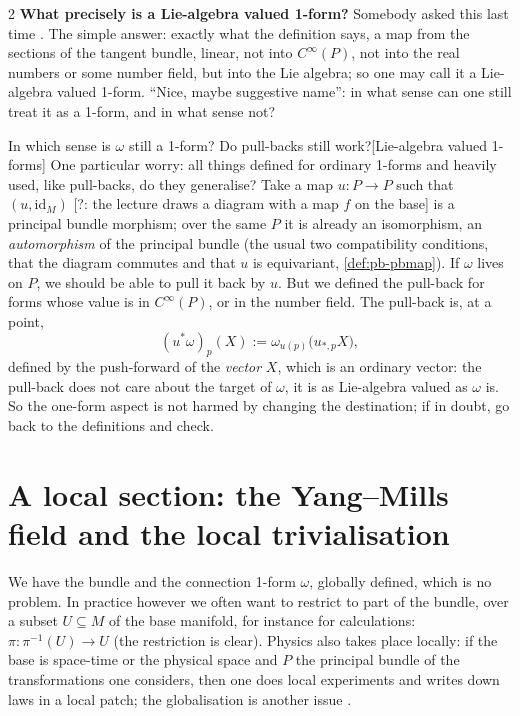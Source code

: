 \begin{paracol}{2}
\textbf{What precisely is a Lie-algebra valued 1-form?} Somebody asked this last time . The simple answer: exactly what the definition says, a map from the sections of the tangent bundle, linear, not into $C^\infty(P)$, not into the real numbers or some number field, but into the Lie algebra; so one may call it a Lie-algebra valued 1-form. ``Nice, maybe suggestive name'': in what sense can one still treat it as a 1-form, and in what sense not?  
\begin{answer}{In which sense is $\omega$ still a 1-form? Do pull-backs still work?}[Lie-algebra valued 1-forms]
One particular worry: all things defined for ordinary 1-forms and heavily used, like pull-backs, do they generalise? Take a map $u\colon P\to P$ such that $(u,\mathrm{id}_M)$ [?: the lecture draws a diagram with a map $f$ on the base] is a principal bundle morphism; over the same $P$ it is already an isomorphism, an \emph{automorphism} of the principal bundle (the usual two compatibility conditions, that the diagram commutes and that $u$ is equivariant, \cref{def:pb-pbmap}). If $\omega$ lives on $P$, we should be able to pull it back by $u$. But we defined the pull-back for forms whose value is in $C^\infty(P)$, or in the number field. The pull-back is, at a point,
\[
  (u^*\omega)_p(X):=\omega_{u(p)}\bigl(u_{*,p}X\bigr),
\]
defined by the push-forward of the \emph{vector} $X$, which is an ordinary vector: the pull-back does not care about the target of $\omega$, it is as Lie-algebra valued as $\omega$ is. So the one-form aspect is not harmed by changing the destination; if in doubt, go back to the definitions and check.           
\end{answer}

\section{A local section: the Yang--Mills field and the local trivialisation}\label{sec:ym-local}

We have the bundle and the connection 1-form $\omega$, globally defined, which is no problem. In practice however we often want to restrict to part of the bundle, over a subset $U\subseteq M$ of the base manifold, for instance for calculations: $\pi\colon\pi^{-1}(U)\to U$ (the restriction is clear). Physics also takes place locally: if the base is space-time or the physical space and $P$ the principal bundle of the transformations one considers, then one does local experiments and writes down laws in a local patch; the globalisation is another issue      .


\end{paracol}
